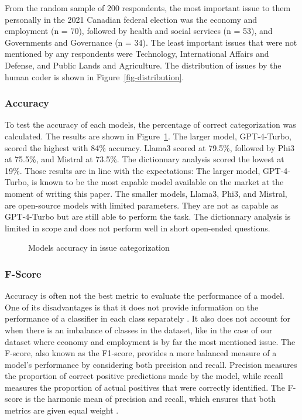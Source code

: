 \documentclass[
  authoryear,
  preprint,
  3p]{elsarticle}
\begin{document}
From the random sample of 200 respondents, the most important issue to
them personally in the 2021 Canadian federal election was the economy
and employment (n = 70), followed by health and social services (n =
53), and Governments and Governance (n = 34). The least important issues
that were not mentioned by any respondents were Technology,
International Affairs and Defense, and Public Lands and Agriculture. The
distribution of issues by the human coder is shown in
Figure~\ref{fig-distribution}.

\subsubsection{Accuracy}\label{accuracy}

To test the accuracy of each models, the percentage of correct
categorization was calculated. The results are shown in
Figure~\ref{fig-accuracy}. The larger model, GPT-4-Turbo, scored the
highest with 84\% accuracy. Llama3 scored at 79.5\%, followed by Phi3 at
75.5\%, and Mistral at 73.5\%. The dictionnary analysis scored the
lowest at 19\%. Those results are in line with the expectations: The
larger model, GPT-4-Turbo, is known to be the most capable model
available on the market at the moment of writing this paper. The smaller
models, Llama3, Phi3, and Mistral, are open-source models with limited
parameters. They are not as capable as GPT-4-Turbo but are still able to
perform the task. The dictionnary analysis is limited in scope and does
not perform well in short open-ended questions.

\begin{figure}[H]


\caption{\label{fig-accuracy}Models accuracy in issue categorization}

\end{figure}%

\subsubsection{F-Score}\label{f-score}

Accuracy is often not the best metric to evaluate the performance of a
model. One of its disadvantages is that it does not provide information
on the performance of a classifier in each class separately
\citep{obi23}. It also does not account for when there is an imbalance
of classes in the dataset, like in the case of our dataset where economy
and employment is by far the most mentioned issue. The F-score, also
known as the F1-score, provides a more balanced measure of a model's
performance by considering both precision and recall. Precision measures
the proportion of correct positive predictions made by the model, while
recall measures the proportion of actual positives that were correctly
identified. The F-score is the harmonic mean of precision and recall,
which ensures that both metrics are given equal weight
\citep{christen_etal24}.
\end{document}
